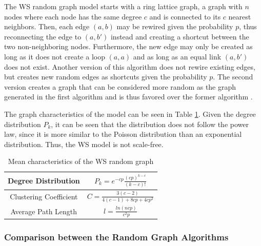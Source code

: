 The WS random graph model starts with a ring lattice graph, a graph 
with $n$ nodes where each node has the same degree $c$ and 
is connected to its $c$ nearest neighbors. Then, each edge $(a, b)$
may be rewired given the probability $p$, thus reconnecting the edge to  $(a, b')$
instead and creating a shortcut between the two non-neighboring nodes.
Furthermore, the new edge may only be created as long as it does not create
a loop $(a, a)$ and as long as an equal link $(a, b')$ does not exist.
Another version of this algorithm does not rewire existing edges,
but creates new random edges as shortcuts given the probability $p$.
The second version creates a graph that can be considered more 
\glqq random\grqq{} as the graph generated in the first algorithm and is
thus favored over the former algorithm \cite{basicnetwork}.

The graph characteristics of the model can be seen
in Table \ref{ws-model}. Given the degree distribution $P_k$, it can be seen
that the distribution does not follow the power law, since it is more similar
to the Poisson distribution than an exponential distribution. Thus, the WS model
is not scale-free.

\begin{table}[ht!]
    \centering
    \begin{tabular}{|c | c |} 
     \hline
     Degree Distribution & 
     $P_k = e^{-cp}\frac{(cp)^{k-c}}{(k-c)!}$ \\ 
     \hline
     Clustering Coefficient & 
     $C=\frac{3(c-2)}{4(c-1) + 8cp +4cp^2}$ \\ 
     \hline
     Average Path Length & $l = \frac{ln(ncp)}{c^2p}$ \\ 
     \hline
    \end{tabular}
    \caption{Mean characteristics of the WS random graph \cite{basicnetwork}}
    \label{ws-model}
\end{table}



\subsubsection{Comparison between the Random Graph Algorithms}


